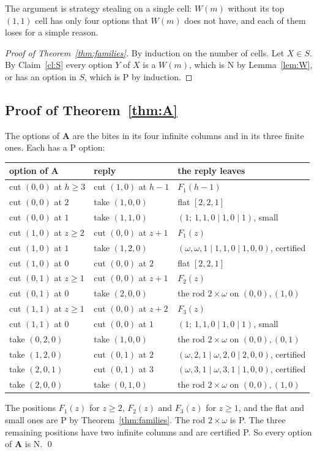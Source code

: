 \documentclass[11pt]{amsart}
\theoremstyle{definition}
\theoremstyle{remark}
\newcommand{\w}{\omega}
\newcommand{\PA}{\mathbf{A}}
\begin{document}
\medskip
The argument is strategy stealing on a single cell: $W(m)$ without its top $(1,1)$ cell has
only four options that $W(m)$ does not have, and each of them loses for a simple reason.

\begin{proof}[Proof of Theorem~\ref{thm:families}]
By induction on the number of cells. Let $X\in S$. By Claim~\ref{cl:S} every option $Y$ of $X$
is a $W(m)$, which is N by Lemma~\ref{lem:W}, or has an option in $S$, which is P by induction.
\end{proof}

\subsection{Proof of Theorem~\ref{thm:A}}
The options of $\PA$ are the bites in its four infinite columns and in its three finite ones.
Each has a P option:
\begin{center}
\begin{tabular}{lll}
\toprule
option of $\PA$ & reply & the reply leaves\\
\midrule
cut $(0,0)$ at $h\ge3$ & cut $(1,0)$ at $h-1$ & $F_1(h-1)$\\
cut $(0,0)$ at $2$ & take $(1,0,0)$ & flat $[2,2,1]$\\
cut $(0,0)$ at $1$ & take $(1,1,0)$ & $(1;\,1,1,0\mid1,0\mid1)$, small\\
cut $(1,0)$ at $z\ge2$ & cut $(0,0)$ at $z+1$ & $F_1(z)$\\
cut $(1,0)$ at $1$ & take $(1,2,0)$ & $(\w,\w,1\mid1,1,0\mid1,0,0)$, certified\\
cut $(1,0)$ at $0$ & cut $(0,0)$ at $2$ & flat $[2,2,1]$\\
cut $(0,1)$ at $z\ge1$ & cut $(0,0)$ at $z+1$ & $F_2(z)$\\
cut $(0,1)$ at $0$ & take $(2,0,0)$ & the rod $2\times\omega$ on $(0,0),(1,0)$\\
cut $(1,1)$ at $z\ge1$ & cut $(0,0)$ at $z+2$ & $F_3(z)$\\
cut $(1,1)$ at $0$ & cut $(0,0)$ at $1$ & $(1;\,1,1,0\mid1,0\mid1)$, small\\
take $(0,2,0)$ & take $(1,0,0)$ & the rod $2\times\omega$ on $(0,0),(0,1)$\\
take $(1,2,0)$ & cut $(0,1)$ at $2$ & $(\w,2,1\mid\w,2,0\mid2,0,0)$, certified\\
take $(2,0,1)$ & cut $(0,1)$ at $3$ & $(\w,3,1\mid\w,3,1\mid1,0,0)$, certified\\
take $(2,0,0)$ & take $(0,1,0)$ & the rod $2\times\omega$ on $(0,0),(1,0)$\\
\bottomrule
\end{tabular}
\end{center}
The positions $F_1(z)$ for $z\ge2$, $F_2(z)$ and $F_3(z)$ for $z\ge1$, and the flat and small
ones are P by Theorem~\ref{thm:families}. The rod $2\times\omega$ is P. The three remaining
positions have two infinite columns and are certified P. So every option of $\PA$ is N. \qed
\end{document}
